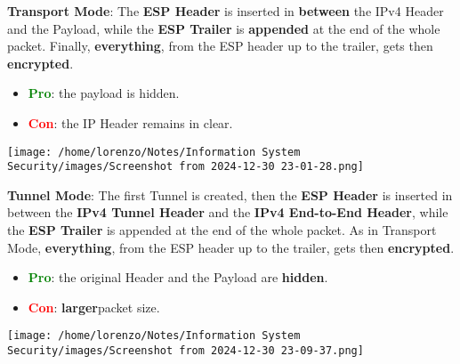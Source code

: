 \begin{itemize}
    \begin{minipage}{0.6\textwidth}
    \vspace{0.2cm}
    \item \textbf{Transport Mode}: The \textbf{ESP Header} is inserted in \textbf{between} the IPv4 Header and the Payload, while the \textbf{ESP Trailer} is \textbf{appended} at the end of the whole packet. Finally, \textbf{everything}, from the ESP header up to the trailer, gets then \textbf{encrypted}. 
    \begin{itemize}
        \item \textcolor{green}{\textbf{Pro}}: the payload is hidden.
        \item \textcolor{red}{\textbf{Con}}: the IP Header remains in clear. 
    \end{itemize}
    \end{minipage} 
    \hspace{0.0cm}
    \begin{minipage}{0.4\textwidth}
        \centering
        \texttt{[image: /home/lorenzo/Notes/Information System Security/images/Screenshot from 2024-12-30 23-01-28.png]}
    \end{minipage}

    \begin{minipage}{0.6\textwidth}
    \item \textbf{Tunnel Mode}: The first Tunnel is created, then the \textbf{ESP Header} is inserted in between the \textbf{IPv4 Tunnel Header} and the \textbf{IPv4 End-to-End Header}, while the \textbf{ESP Trailer} is appended at the end of the whole packet. As in Transport Mode, \textbf{everything}, from the ESP header up to the
    trailer, gets then \textbf{encrypted}.
    \begin{itemize}
        \item \textcolor{green}{\textbf{Pro}}: the original  Header and the Payload are \textbf{hidden}.
        \item \textcolor{red}{\textbf{Con}}: \textbf{larger}packet size.
    \end{itemize}
    \end{minipage} 
    \hspace{0.0cm}
    \begin{minipage}{0.4\textwidth}
        \centering
        \texttt{[image: /home/lorenzo/Notes/Information System Security/images/Screenshot from 2024-12-30 23-09-37.png]}
    \end{minipage}

\end{itemize}